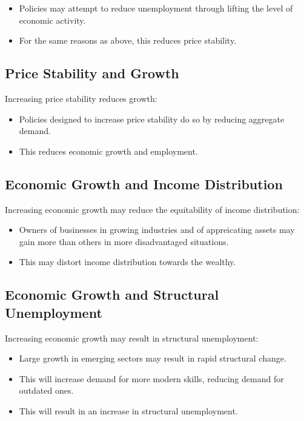 \documentclass[a4paper,11pt]{article}
\begin{document}
\begin{itemize}
\item Policies may attempt to reduce unemployment through lifting the level of
	economic activity.
\item For the same reasons as above, this reduces price stability.
\end{itemize}


\subsection{Price Stability and Growth}

Increasing price stability reduces growth:

\begin{itemize}
\item Policies designed to increase price stability do so by reducing aggregate
	demand.
\item This reduces economic growth and employment.
\end{itemize}


\subsection{Economic Growth and Income Distribution}

Increasing economic growth may reduce the equitability of income distribution:

\begin{itemize}
\item Owners of businesses in growing industries and of appreicating assets may
	gain more than others in more disadvantaged situations.
\item This may distort income distribution towards the wealthy.
\end{itemize}


\subsection{Economic Growth and Structural Unemployment}

Increasing economic growth may result in structural unemployment:

\begin{itemize}
\item Large growth in emerging sectors may result in rapid structural change.
\item This will increase demand for more modern skills, reducing demand for
	outdated ones.
\item This will result in an increase in structural unemployment.
\end{itemize}
\end{document}
